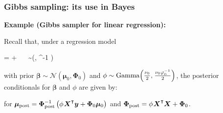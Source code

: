\documentclass[18pt]{beamer}
\newcommand{\defineTightSpacing}{%
	\setlength{\abovedisplayskip}{.3\baselineskip}%
	\setlength{\belowdisplayskip}{.3\baselineskip}%
}
\newenvironment{tightEquation*}{%
	\defineTightSpacing%
	\begin{equation*}
}{
	\end{equation*} \ignorespacesafterend
}
\newcommand{\given}{\thinnerspace | \thinnerspace}
\newcommand{\transpose}{\text{\raisebox{.5ex}{$\intercal$}}}
\newcommand{\thinnerspace}{\mskip.5\thinmuskip}
\newcommand{\normalDist}{\mathcal{N}}
\newcommand{\gammaDist}{\mathrm{Gamma}}
\newcommand{\bX}{\bm{X}}
\newcommand{\bmu}{\bm{\mu}}
\newcommand{\bbeta}{\bm{\beta}}
\newcommand{\bPhi}{\bm{\Phi}}
\begin{document}
\renewcommand{\frametitleText}{Gibbs sampling: its use in Bayes}
\begin{frame}
\frametitle{\frametitleText}

\textbf{Example {\normalfont (Gibbs sampler for linear regression)}:}\\
\smallskip

Recall that, under a regression model 
\begin{tightEquation*}
 = \bX \bbeta + \bm{\epsilon} 
	\  \,
	\bm{\epsilon} \sim \normalDist\!\left(, \phi^{-1}  \right)
\end{tightEquation*}
with prior $\bbeta \sim \normalDist(\bmu_0, \bPhi_0)$ and $\phi \sim \gammaDist\!\left( \frac{\nu_0 \vphantom{\varphi_0^{-1}}}{2}, \thinnerspace \frac{\nu_0 \varphi_0^{-1}}{2} \right)$, 
\pause%
the posterior conditionals for $\bbeta$ and $\phi$ are given by:
\vspace*{.15\baselineskip}
\vspace*{.15\baselineskip}%
for $\bmu_{\textrm{post}} = \bPhi_{\textrm{post}}^{-1} \left( \phi \thinnerspace \bX^\transpose \bm{y} + \bPhi_0 \bmu_0 \right)$ and $\bPhi_{\textrm{post}} = \phi \thinnerspace \bX^\transpose \bX + \bPhi_0$.

\end{frame}
\end{document}

